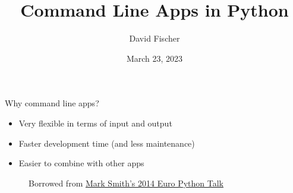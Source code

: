 \documentclass[aspectratio=169]{beamer}
\title{Command Line Apps in Python}
\author{David Fischer}
\date{March 23, 2023}
\begin{document}
\maketitle

\begin{frame}
\frametitle{}
  {\huge Why command line apps?}
\end{frame}


\begin{frame}
  \begin{itemize}
    \item Very flexible in terms of input and output
    \item Faster development time (and less maintenance)
    \item Easier to combine with other apps
  \end{itemize}
\end{frame}


\begin{frame}
  \begin{figure}[p]
    \centering
    \caption{Borrowed from \href{http://pyvideo.org/europython-2014/writing-awesome-command-line-programs-in-python.html}{Mark Smith's 2014 Euro Python Talk}}
  \end{figure}
\end{frame}
\end{document}

